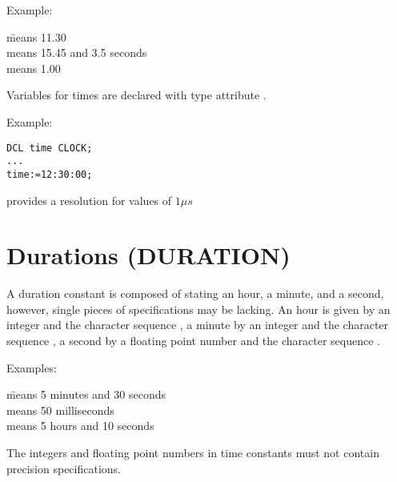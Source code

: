 Example:

\begin{tabbing}
 \x \= means 11.30\\
   \> means 15.45 and 3.5 seconds\\
    \> means 1.00
\end{tabbing}

Variables for times are declared with type attribute .

\begin{grammarframe}
\end{grammarframe}

Example:

\begin{lstlisting}
DCL time CLOCK;
...
time:=12:30:00;
\end{lstlisting}

\OpenPEARL{} provides a resolution for  values of $1\mu s$

\section{Durations (DURATION)}   %
\label{sec_type_duration}

A duration constant is composed of stating an hour, a minute, and a
second, however, single pieces of specifications may be lacking. An hour
is given by an integer and the character sequence , a minute by an
integer and the character sequence , a second by a floating point
number and the character sequence .

Examples:

\begin{tabbing}
    \= means 5 minutes and 30 seconds \\
             \> means 50 milliseconds \\
    \> means 5 hours and 10 seconds
\end{tabbing}

The integers and floating point numbers in time constants must not
contain precision specifications.

